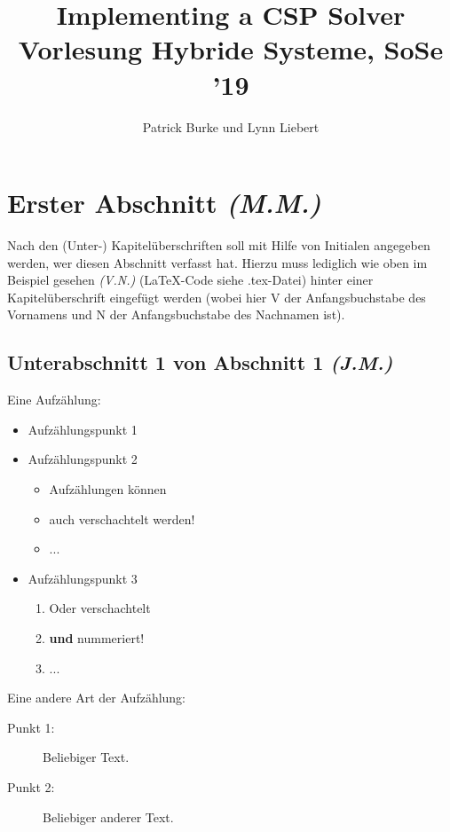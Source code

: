 \documentclass{article}
\title{Implementing a CSP Solver\\\small{Vorlesung Hybride Systeme, SoSe '19}}
\author{Patrick Burke und Lynn Liebert}
\newcommand{\initials}[1]{\small{\textit{(#1)}} \normalsize}
\begin{document}
\maketitle %

\listoftodos

\begin{abstract}
\end{abstract}

\tableofcontents
\newpage


\newpage


\section{Erster Abschnitt \initials{M.M.}}
Nach den (Unter-) Kapitelüberschriften soll mit Hilfe von Initialen angegeben werden, wer diesen Abschnitt verfasst hat. Hierzu muss lediglich wie oben im Beispiel gesehen \initials{V.N.} (LaTeX-Code siehe .tex-Datei) hinter einer Kapitelüberschrift eingefügt werden (wobei hier V der Anfangsbuchstabe des Vornamens und N der Anfangsbuchstabe des Nachnamen ist). 
\subsection{Unterabschnitt 1 von Abschnitt 1 \initials{J.M.}}
Eine Aufzählung:
\begin{itemize}
    \item Aufzählungspunkt 1
    \item Aufzählungspunkt 2
	\begin{itemize}
	    \item Aufzählungen können 
	    \item auch verschachtelt werden!
	    \item ...
	\end{itemize}    
    \item Aufzählungspunkt 3
	\begin{enumerate}
	    \item Oder verschachtelt
	    \item \textbf{und} nummeriert!
	    \item ...
	\end{enumerate}
\end{itemize}
Eine andere Art der Aufzählung:
\begin{description}
    \item[Punkt 1: ] Beliebiger Text.
    \item[Punkt 2: ] Beliebiger anderer Text.
\end{description}
\end{document}
